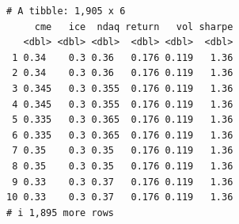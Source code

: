 \documentclass[
  letterpaper,
  DIV=11,
  numbers=noendperiod]{scrreprt}
\newenvironment{Shaded}{\begin{snugshade}}{\end{snugshade}}
\newcommand{\AttributeTok}[1]{\textcolor[rgb]{0.40,0.45,0.13}{#1}}
\newcommand{\CommentTok}[1]{\textcolor[rgb]{0.37,0.37,0.37}{#1}}
\newcommand{\DecValTok}[1]{\textcolor[rgb]{0.68,0.00,0.00}{#1}}
\newcommand{\FloatTok}[1]{\textcolor[rgb]{0.68,0.00,0.00}{#1}}
\newcommand{\FunctionTok}[1]{\textcolor[rgb]{0.28,0.35,0.67}{#1}}
\newcommand{\NormalTok}[1]{\textcolor[rgb]{0.00,0.23,0.31}{#1}}
\newcommand{\OtherTok}[1]{\textcolor[rgb]{0.00,0.23,0.31}{#1}}
\newcommand{\SpecialCharTok}[1]{\textcolor[rgb]{0.37,0.37,0.37}{#1}}
\begin{document}
\begin{Shaded}
\end{Shaded}

\begin{verbatim}
# A tibble: 1,905 x 6
     cme   ice  ndaq return   vol sharpe
   <dbl> <dbl> <dbl>  <dbl> <dbl>  <dbl>
 1 0.34    0.3 0.36   0.176 0.119   1.36
 2 0.34    0.3 0.36   0.176 0.119   1.36
 3 0.345   0.3 0.355  0.176 0.119   1.36
 4 0.345   0.3 0.355  0.176 0.119   1.36
 5 0.335   0.3 0.365  0.176 0.119   1.36
 6 0.335   0.3 0.365  0.176 0.119   1.36
 7 0.35    0.3 0.35   0.176 0.119   1.36
 8 0.35    0.3 0.35   0.176 0.119   1.36
 9 0.33    0.3 0.37   0.176 0.119   1.36
10 0.33    0.3 0.37   0.176 0.119   1.36
# i 1,895 more rows
\end{verbatim}
\end{document}

